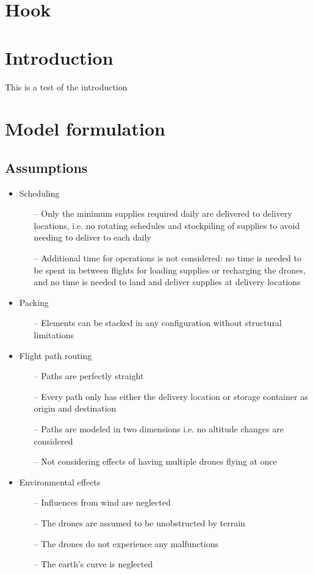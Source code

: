 \documentclass[12pt]{article}
\begin{document}
\begin{multicols}{2}
\section{Hook}
\lipsum[1]

\section{Introduction}
This is a test of the introduction \cite{Gow1995}

\section{Model formulation}
\lipsum[3]

\subsection{Assumptions}

\begin{itemize}
	\item Scheduling
	\begin{itemize}
		\item[--] Only the minimum supplies required daily are delivered to delivery locations, i.e. no rotating schedules and stockpiling of supplies to avoid needing to deliver to each daily
		\item[--] Additional time for operations is not considered: no time is needed to be spent in between flights for loading supplies or recharging the drones, and no time is needed to land and deliver supplies at delivery locations
	\end{itemize}
	\item Packing
	\begin{itemize}
		\item[--] Elements can be stacked in any configuration without structural limitations
	\end{itemize}
	\item Flight path routing
	\begin{itemize}
		\item[--] Paths are perfectly straight
		\item[--] Every path only has either the delivery location or storage container as origin and destination
		\item[--] Paths are modeled in two dimensions i.e. no altitude changes are considered
		\item[--] Not considering effects of having multiple drones flying at once
	\end{itemize}
	\item Environmental effects
	\begin{itemize}
		\item[--] Influences from wind are neglected
		\item[--] The drones are assumed to be unobstructed by terrain
		\item[--] The drones do not experience any malfunctions
		\item[--] The earth’s curve is neglected
	\end{itemize}
\end{itemize}



\end{multicols}
\end{document}
